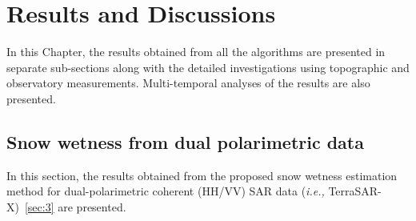 \chapter{Results and Discussions}
\label{sec:4}
In this Chapter, the results obtained from all the algorithms are presented in separate sub-sections along with the detailed investigations using topographic and observatory measurements. Multi-temporal analyses of the results are also presented. 
\section{Snow wetness from dual polarimetric data}
\FloatBarrier
In this section, the results obtained from the proposed snow wetness estimation method for dual-polarimetric coherent (HH/VV) SAR data (\emph{i.e.,} TerraSAR-X)~\cref{sec:3} are presented. 


